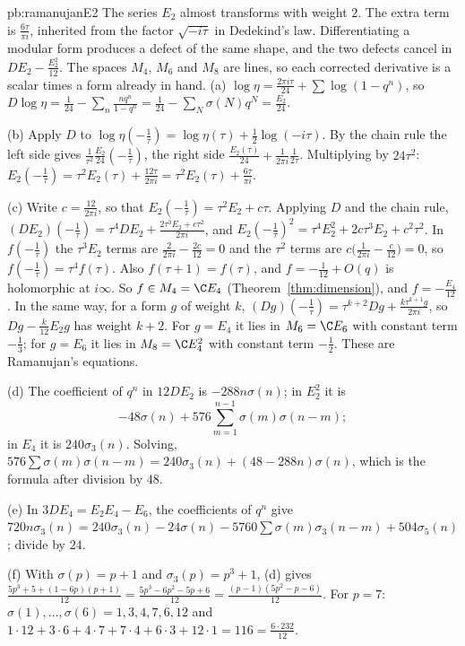 \begin{solution}{pb:ramanujanE2}
\idea The series $E_2$ almost transforms with weight $2$. The extra term is $\frac{6\tau}{\pi i}$, inherited from the factor $\sqrt{-i\tau}$ in Dedekind's law. Differentiating a modular form produces a defect of the same shape, and the two defects cancel in $DE_2-\frac{E_2^2}{12}$. The spaces $M_4$, $M_6$ and $M_8$ are lines, so each corrected derivative is a scalar times a form already in hand.
\writeup (a) $\log\eta=\frac{2\pi i\tau}{24}+\sum\log(1-q^n)$, so $D\log\eta=\frac1{24}-\sum_n\frac{nq^n}{1-q^n}=\frac1{24}-\sum_N\sigma(N)q^N=\frac{E_2}{24}$.

(b) Apply $D$ to $\log\eta(-\frac1\tau)=\log\eta(\tau)+\frac12\log(-i\tau)$. By the chain rule the left side gives $\frac1{\tau^2}\frac{E_2}{24}(-\frac1\tau)$, the right side
$\frac{E_2(\tau)}{24}+\frac1{2\pi i}\frac1{2\tau}$. Multiplying by $24\tau^2$: $E_2(-\frac1\tau)=\tau^2E_2(\tau)+\frac{12\tau}{2\pi i}=\tau^2E_2(\tau)+\frac{6\tau}{\pi i}$.

(c) Write $c=\frac{12}{2\pi i}$, so that $E_2(-\frac1\tau)=\tau^2E_2+c\tau$. Applying $D$ and the chain rule, $(DE_2)(-\frac1\tau)=\tau^4DE_2+\frac{2\tau^3E_2+c\tau^2}{2\pi i}$, and
$E_2(-\frac1\tau)^2=\tau^4E_2^2+2c\tau^3E_2+c^2\tau^2$. In $f(-\frac1\tau)$ the $\tau^3E_2$ terms are $\frac2{2\pi i}-\frac{2c}{12}=0$ and the $\tau^2$ terms are $c\bigl(\frac1{2\pi i}-\frac c{12}\bigr)=0$,
so $f(-\frac1\tau)=\tau^4f(\tau)$. Also $f(\tau+1)=f(\tau)$, and $f=-\frac1{12}+O(q)$ is holomorphic at $i\infty$. So $f\in M_4=\C E_4$ (Theorem~\ref{thm:dimension}), and $f=-\frac{E_4}{12}$.
In the same way, for a form $g$ of weight $k$, $(Dg)(-\frac1\tau)=\tau^{k+2}Dg+\frac{k\tau^{k+1}g}{2\pi i}$, so $Dg-\frac k{12}E_2g$ has weight $k+2$. For $g=E_4$ it lies in $M_6=\C E_6$
with constant term $-\frac13$; for $g=E_6$ it lies in $M_8=\C E_4^2$ with constant term $-\frac12$. These are Ramanujan's equations.

(d) The coefficient of $q^n$ in $12DE_2$ is $-288n\sigma(n)$; in $E_2^2$ it is
\[
-48\sigma(n)+576\sum_{m=1}^{n-1}\sigma(m)\sigma(n-m);
\]
in $E_4$ it is $240\sigma_3(n)$. Solving,
$576\sum\sigma(m)\sigma(n-m)=240\sigma_3(n)+(48-288n)\sigma(n)$, which is the formula after division by $48$.

(e) In $3DE_4=E_2E_4-E_6$, the coefficients of $q^n$ give $720n\sigma_3(n)=240\sigma_3(n)-24\sigma(n)-5760\sum\sigma(m)\sigma_3(n-m)+504\sigma_5(n)$; divide by $24$.

(f) With $\sigma(p)=p+1$ and $\sigma_3(p)=p^3+1$, (d) gives $\frac{5p^3+5+(1-6p)(p+1)}{12}=\frac{5p^3-6p^2-5p+6}{12}=\frac{(p-1)(5p^2-p-6)}{12}$. For $p=7$: $\sigma(1),\dots,\sigma(6)=1,3,4,7,6,12$ and
$1\cdot12+3\cdot6+4\cdot7+7\cdot4+6\cdot3+12\cdot1=116=\frac{6\cdot232}{12}$.


\end{solution}
